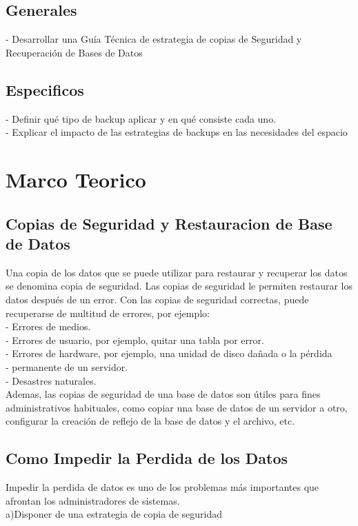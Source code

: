 \documentclass[12pt,letterpaper]{article}
\begin{document}
\subsection{Generales}
- Desarrollar una Guía Técnica de estrategia de copias de Seguridad y Recuperación de Bases de Datos
\subsection{Especificos}
- Definir qué tipo de backup aplicar y en qué consiste cada uno.\\
- Explicar el impacto de las estrategias de backups en las necesidades del espacio\\

\newpage
\section{Marco Teorico}
\subsection{Copias de Seguridad y Restauracion de Base de Datos}
Una copia de los datos que se puede utilizar para restaurar y recuperar los datos se denomina copia de seguridad. Las copias de seguridad le permiten restaurar los datos después de un error. Con las copias de seguridad correctas, puede recuperarse de multitud de errores, por ejemplo:  \\
- Errores de medios. \\ 
- Errores de usuario, por ejemplo, quitar una tabla por error. \\
- Errores de hardware, por ejemplo, una unidad de disco dañada o la pérdida \\
- permanente de un servidor. \\
- Desastres naturales. \\

Ademas, las copias de seguridad de una base de datos son útiles para fines administrativos habituales, como copiar una base de datos de un servidor a otro, configurar la creación de reflejo de la base de datos y el archivo, etc. \\

\subsection{Como Impedir la Perdida de los Datos}

Impedir la perdida de datos es uno de los problemas más importantes que afrontan los administradores de sistemas.  \\
a)Disponer de una estrategia de copia de seguridad \\
 
\end{document}
